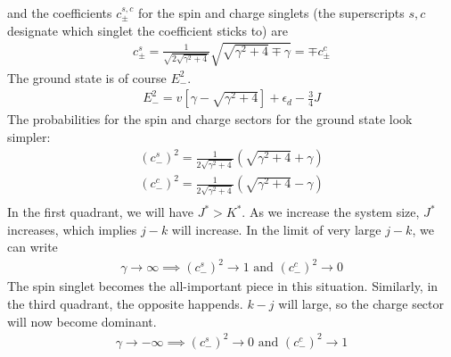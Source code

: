 \documentclass[12pt,twoside]{article}
\numberwithin{equation}{section}
\begin{document}
and the coefficients \(c^{s,c}_\pm\) for the spin and charge singlets (the superscripts \(s,c\) designate which singlet the coefficient sticks to) are
\begin{equation}\begin{aligned}
	c^s_\pm = \frac{1}{\sqrt{2\sqrt{\gamma^2 + 4}}}\sqrt{\sqrt{\gamma^2 + 4} \mp \gamma} = \mp c^c_\pm
\end{aligned}\end{equation}
The ground state is of course \(E^2_-\).
\begin{equation}\begin{aligned}
	E^2_- = v\left[ \gamma - \sqrt{\gamma^2 + 4} \right] + \epsilon_d - \frac{3}{4}J
\end{aligned}\end{equation}
The probabilities for the spin and charge sectors for the ground state look simpler:
\begin{equation}\begin{aligned}
	\left( c^s_- \right)^2 = \frac{1}{2\sqrt{\gamma^2 + 4}}\left(\sqrt{\gamma^2 + 4} + \gamma\right)\\
	\left( c^c_- \right)^2 = \frac{1}{2\sqrt{\gamma^2 + 4}}\left(\sqrt{\gamma^2 + 4} - \gamma\right)\\
\end{aligned}\end{equation}
In the first quadrant, we will have \(J^* > K^*\). As we increase the system size, \(J^*\) increases, which implies \(j-k\) will increase. In the limit of very large \(j-k\), we can write
\begin{equation}\begin{aligned}
	\gamma \to \infty \implies \left( c^s_- \right)^2 \to 1 \text{ and } \left( c^c_- \right)^2 \to 0
\end{aligned}\end{equation}
The spin singlet becomes the all-important piece in this situation. Similarly, in the third quadrant, the opposite happends. \(k-j\) will large, so the charge sector will now become  dominant.
\begin{equation}\begin{aligned}
	\gamma \to -\infty \implies \left( c^s_- \right)^2 \to 0 \text{ and } \left( c^c_- \right)^2 \to 1
\end{aligned}\end{equation}
\end{document}
